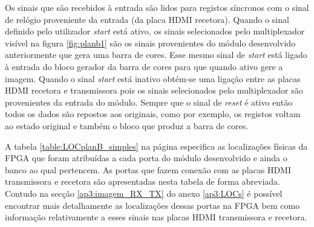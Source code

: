 Os sinais que são recebidos à entrada são lidos para registos síncronos com o sinal de relógio proveniente da entrada (da placa HDMI recetora). Quando o sinal definido pelo utilizador \textit{start} está ativo, os sinais selecionados pelo multiplexador visível na figura \ref{fig:planb1} são os sinais provenientes do módulo desenvolvido anteriormente que gera uma barra de cores. Esse mesmo sinal de \textit{start} está ligado à entrada do bloco gerador da barra de cores para que quando ativo gere a imagem. Quando o sinal \textit{start} está inativo obtém-se uma ligação entre as placas HDMI recetora e transmissora pois os sinais selecionados pelo multiplexador são provenientes da entrada do módulo. Sempre que o sinal de \textit{reset} é ativo então todos os dados são repostos aos originais, como por exemplo, os registos voltam ao estado original e também o bloco que produz a barra de cores.

A tabela \ref{table:LOCplanB_simples} na página \pageref{table:LOCplanB_simples} especifica as localizações físicas da FPGA que foram atribuídas a cada porta do módulo desenvolvido e ainda o banco ao qual pertencem. As portas que fazem conexão com as placas HDMI transmissora e recetora são apresentadas nesta tabela de forma abreviada. Contudo na secção \ref{ap3:imagem_RX_TX} do anexo \ref{ap3:LOCs} é possível encontrar mais detalhamente as localizações dessas portas na FPGA bem como informação relativamente a esses sinais nas placas HDMI transmissora e recetora.

